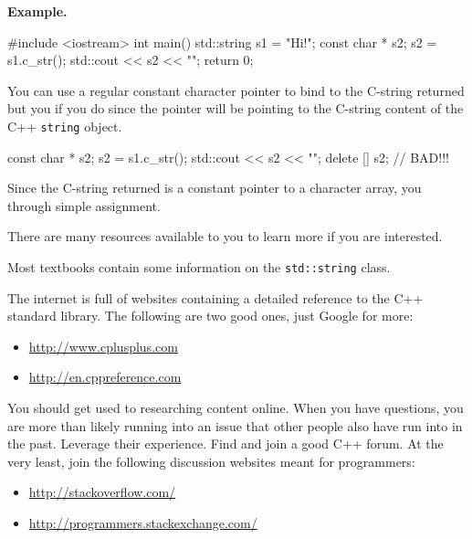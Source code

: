 \textbf{Example.}

\begin{console}
#include <iostream>
int main()
{   
    std::string s1 = "Hi!";
    const char * s2;
    s2 = s1.c_str();
    std::cout << s2 << "\n";
    return 0;
}
\end{console}

You can use a regular constant character pointer to bind to the C-string returned but you  if you do since the pointer will be pointing to the C-string content of the C++ \texttt{string} object.

\begin{console}
const char * s2;
s2 = s1.c_str();
std::cout << s2 << "\n";
delete [] s2; // BAD!!!
\end{console}

Since the C-string returned is a constant pointer to a character array,
you  through simple
assignment.


\newpage{}

There are many resources available to you to learn more if you are
interested.

Most textbooks contain some information on the \texttt{std::string} class.

The internet is full of websites containing a detailed reference to the
C++ standard library. The following are two good ones, just Google for
more:

\begin{itemize}
\item
  \href{http://www.cplusplus.com/}{http://www.cplusplus.com}
\item
  \href{http://en.cppreference.com/}{http://en.cppreference.com}
\end{itemize}

You should get used to researching content online. When you have
questions, you are more than likely running into an issue that other
people also have run into in the past. Leverage their experience. Find
and join a good C++ forum. At the very least, join the following
discussion websites meant for programmers:

\begin{itemize}
\item
  \url{http://stackoverflow.com/}
\item
  \url{http://programmers.stackexchange.com/}
\end{itemize}

